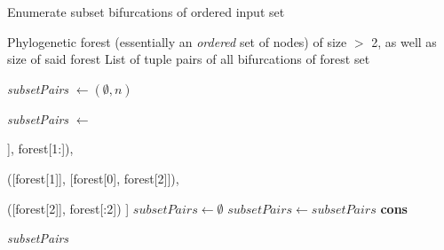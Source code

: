 \documentclass{article}
\begin{document}
\begin{algorithm}
\caption{Enumerate subset bifurcations of ordered input set}\label{generate_subsets}
\begin{algorithmic}[1]
\label{subsets}
    \Require Phylogenetic forest (essentially an \textit{ordered} set of nodes) of size $>$ 2, as well as size of said forest
    \Ensure  List of tuple pairs of all bifurcations of forest set


                
        \State \textit{subsetPairs} $\gets (\emptyset, n)$

            
        \State \textit{subsetPairs} $\gets$

               \quad \quad \quad \quad \quad  [ ([forest[0]], forest[1:]),

               \quad \quad \quad \quad \quad    ([forest[1]], [forest[0], forest[2]]),

               \quad \quad \quad \quad \quad    ([forest[2]], forest[:2])  ]
    \Else                           {}
        \State ${subsetPairs} \gets \emptyset$
            \State ${subsetPairs} \gets {subsetPairs}$ \textbf{cons}


                \EndFor
            \EndIf
        \EndFor
    \EndIf

    \Return \textit{subsetPairs}


\EndFunction

\end{algorithmic}
\end{algorithm}
\end{document}
